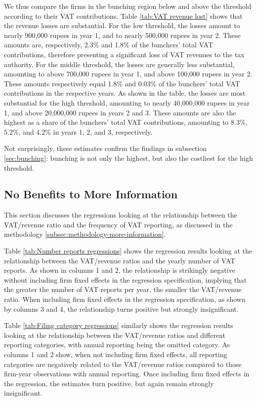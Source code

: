 We thus compare the firms in the bunching region below and above the
threshold according to their VAT contributions. Table \ref{tab:VAT revenue lost}
shows that the revenue losses are substantial. For the low threshold,
the losses amount to nearly 900,000 rupees in year 1, and to nearly
500,000 rupees in year 2. These amounts are, respectively, 2.3\% and
1.8\% of the bunchers' total VAT contributions, therefore presenting
a significant loss of VAT revenues to the tax authority. For the middle
threshold, the losses are generally less substantial, amounting to
above 700,000 rupees in year 1, and above 100,000 rupees in year 2.
These amounts respectively equal 1.8\% and 0.03\% of the bunchers'
total VAT contributions in the respective years. As shown in the table,
the losses are most substantial for the high threshold, amounting
to nearly 40,000,000 rupees in year 1, and above 20,000,000 rupees
in years 2 and 3. These amounts are also the highest as a share of
the bunchers' total VAT contributions, amounting to 8.3\%, 5.2\%,
and 4.2\% in years 1, 2, and 3, respectively.

Not surprisingly, these estimates confirm the findings in subsection
\ref{sec:bunching}: bunching is not only the highest, but also the
costliest for the high threshold.

\subsection{No Benefits to More Information}
\label{subsec:results-more-information}
This section discusses the regressions looking at the relationship between the VAT/revenue ratio and the frequency of VAT reporting, as discussed in the methodology \cref{subsec:methodology-more-information}.

Table \ref{tab:Number reports regressions} shows the regression results
looking at the relationship between the VAT/revenue ratios and the
yearly number of VAT reports. As shown in columns 1 and 2, the relationship
is strikingly negative without including firm fixed effects in the
regression specification, implying that the greater the number of
VAT reports per year, the smaller the VAT/revenue ratio. When including
firm fixed effects in the regression specification, as shown by columns
3 and 4, the relationship turns positive but strongly insignificant.

Table \ref{tab:Filing category regressions} similarly shows the regression
results looking at the relationship between the VAT/revenue ratios
and different reporting categories, with annual reporting being the
omitted category. As columns 1 and 2 show, when not including firm
fixed effects, all reporting categories are negatively related to
the VAT/revenue ratios compared to those firm-year observations with
annual reporting. Once including firm fixed effects in the regression,
the estimates turn positive, but again remain strongly insignificant.

